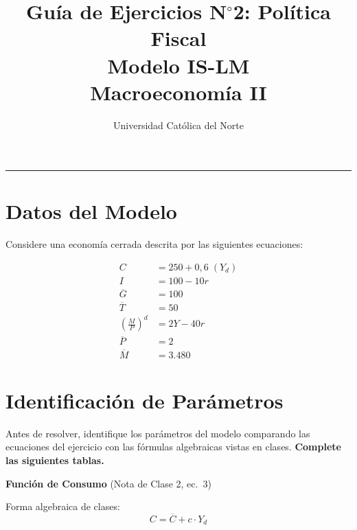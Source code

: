 \documentclass[11pt,a4paper]{article}
\title{\textbf{Gu\'{i}a de Ejercicios N$^\circ$2: Pol\'{i}tica Fiscal} \\ \large Modelo IS-LM \\ \normalsize Macroeconom\'{i}a II}
\author{Universidad Cat\'{o}lica del Norte}
\date{}
\newcommand{\barvar}[1]{\overline{#1}}
\begin{document}
\maketitle
\thispagestyle{empty}

\vspace{-0.5cm}
\noindent\textcolor{grismedio}{\rule{\textwidth}{0.5pt}}
\vspace{0.3cm}

\section{Datos del Modelo}

Considere una econom\'{i}a cerrada descrita por las siguientes ecuaciones:

\begin{align}
    C &= 250 + 0{,}6 \; (Y_d) \label{eq:consumo} \\[4pt]
    I &= 100 - 10r \label{eq:inversion} \\[4pt]
    \barvar{G} &= 100 \label{eq:gasto} \\[4pt]
    \barvar{T} &= 50 \label{eq:impuesto} \\[4pt]
    \left(\frac{M}{P}\right)^d &= 2Y - 40r \label{eq:demandadinero} \\[4pt]
    \barvar{P} &= 2 \label{eq:precios} \\[4pt]
    \barvar{M} &= 3.480 \label{eq:ofertamonetaria}
\end{align}


\section{Identificaci\'{o}n de Par\'{a}metros}

Antes de resolver, identifique los par\'{a}metros del modelo comparando las ecuaciones del ejercicio con las f\'{o}rmulas algebraicas vistas en clases. \textbf{Complete las siguientes tablas.}

\vspace{0.4cm}

\noindent\textbf{Funci\'{o}n de Consumo} \hfill \textcolor{grismedio}{\small (Nota de Clase 2, ec.\ 3)}

\vspace{0.1cm}
\noindent Forma algebraica de clases:
\[
    C = \barvar{C} + c \cdot Y_d
\]
\end{document}
